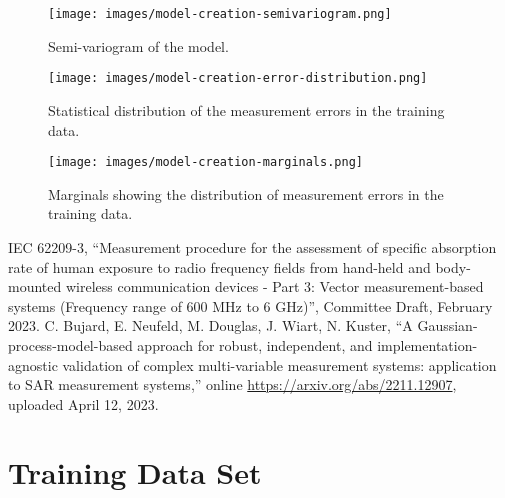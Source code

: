 \documentclass{article}
\begin{document}


\begin{figure} \centering
\texttt{[image: images/model-creation-semivariogram.png]}
\caption{Semi-variogram of the model.} \label{fig:creation-variogram}
\end{figure}

\begin{figure} \centering
\texttt{[image: images/model-creation-error-distribution.png]}
\caption{Statistical distribution of the measurement errors in the training data.} \label{fig:creation-errors}
\end{figure}

\begin{figure} \centering
\texttt{[image: images/model-creation-marginals.png]}
\caption{Marginals showing the distribution of measurement errors in the training data.} \label{fig:creation-marginals}
\end{figure}

\FloatBarrier
\begin{thebibliography}{9}
IEC 62209-3, ``Measurement procedure for the assessment of specific absorption rate of human exposure to radio frequency fields from hand-held and body-mounted wireless communication devices - Part 3: Vector measurement-based systems (Frequency range of 600 MHz to 6 GHz)'', Committee Draft, February 2023.
C. Bujard, E. Neufeld, M. Douglas, J. Wiart, N. Kuster, ``A Gaussian-process-model-based approach for robust, independent, and implementation-agnostic validation of complex multi-variable measurement systems: application to SAR measurement systems,'' online \url{https://arxiv.org/abs/2211.12907}, uploaded April 12, 2023.
\end{thebibliography}

\FloatBarrier
\appendix
\section{Training Data Set} \label{sec:training-data}


\end{document}
